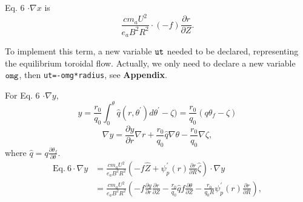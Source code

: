 \documentclass[12pt]{article}
\begin{document}
\begin{CJK*}{UTF8}{gbsn}
Eq. 6 $\cdot \nabla x$ is
\begin{equation}
    \frac{cm_aU^2}{e_aB^2R^2} \cdot (-f) \frac{\partial r}{\partial Z}.
\end{equation}

To implement this term, a new variable ${\tt ut}$ needed to be declared, representing the equilibrium toroidal flow. 
Actually, we only need to declare a new variable ${\tt omg}$, then \texttt{ut=-omg*radius}, see {\bf Appendix}.

For Eq. 6 $\cdot \nabla y$, 
\begin{equation}
    y = \frac{r_0}{q_0}\int_{0}^{\theta}\hat{q}(r,\theta^{'})d\theta^{'}-\zeta)=\frac{r_0}{q_0}(q\theta_f-\zeta)
\end{equation}
\begin{equation}
    \nabla y = \frac{\partial y}{\partial r} \nabla r + \frac{r_0}{q_0} \hat{q} \nabla \theta - \frac{r_0}{q_0} \nabla \zeta,\label{eqdely}
\end{equation}
where $\hat{q} = q \frac{\partial \theta_f}{\partial \theta}$. 
\begin{equation}
\begin{split}
    \textrm{Eq.}\ 6 \cdot \nabla y &= \frac{cm_aU^2}{e_aB^2R^2}(-f\hat{Z} + \psi_p^{'}(r)\frac{\partial r}{\partial R} \hat{\zeta}) \cdot \nabla y \\
                                   &= \frac{cm_aU^2}{e_aB^2R^2}(-f \frac{\partial y}{\partial r} \frac{\partial r}{\partial Z} - \frac{r_0}{q_0} \hat{q} f 
                                      \frac{\partial \theta}{\partial Z} - \frac{r_0}{q_0R} \psi_p^{'}(r)\frac{\partial r}{\partial R}), 
\end{split}
\end{equation}


\end{CJK*}
\end{document}
